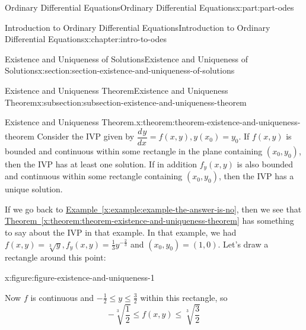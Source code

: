 \documentclass[twoside,10pt,]{book}
\newcommand{\xreffont}{\relax}
\numberwithin{equation}{part}
\providecommand{\dv}[3][]{\dfrac{d^{#1} #2}{d #3^{#1}}}
\begin{document}
\begin{partptx}{Ordinary Differential Equations}{}{Ordinary Differential Equations}{}{}{x:part:part-odes}
\begin{chapterptx}{Introduction to Ordinary Differential Equations}{}{Introduction to Ordinary Differential Equations}{}{}{x:chapter:intro-to-odes}
\begin{sectionptx}{Existence and Uniqueness of Solutions}{}{Existence and Uniqueness of Solutions}{}{}{x:section:section-existence-and-uniqueness-of-solutions}
\begin{subsectionptx}{Existence and Uniqueness Theorem}{}{Existence and Uniqueness Theorem}{}{}{x:subsection:subsection-existence-and-uniqueness-theorem}
\begin{theorem}{Existence and Uniqueness Theorem.}{}{x:theorem:theorem-existence-and-uniqueness-theorem}
%
Consider the IVP given by \(\dv{y}{x} = f(x,y), y(x_{0}) = y_{0}\). If \(f(x,y)\) is bounded and continuous within some rectangle in the plane containing \((x_{0},y_{0})\), then the IVP has at least one solution. If in addition \(f_{y}(x,y)\) is also bounded and continuous within some rectangle containing \((x_{0},y_{0})\), then the IVP has a unique solution.%
\end{theorem}
If we go back to \hyperref[x:example:example-the-answer-is-no]{Example~{\xreffont\ref{x:example:example-the-answer-is-no}}}, then we see that \hyperref[x:theorem:theorem-existence-and-uniqueness-theorem]{Theorem~{\xreffont\ref{x:theorem:theorem-existence-and-uniqueness-theorem}}} has something to say about the IVP in that example. In that example, we had \(f(x,y) = \sqrt[3]{y}, f_{y}(x,y) = \frac{1}{3}y^{-\frac{2}{3}}\) and \((x_{0},y_{0}) = (1,0)\). Let's draw a rectangle around this point: \begin{figureptx}{}{x:figure:figure-existence-and-uniqueness-1}{}%
\begin{image}{0.25}{0.5}{0.25}%
%
\end{image}%
\tcblower
\end{figureptx}%
%
\par
Now \(f\) is continuous and \(-\frac{1}{2}\leq y\leq\frac{3}{2}\) within this rectangle, so%
\begin{equation*}
-\sqrt[3]{\frac{1}{2}}\leq f(x,y)\leq\sqrt[3]{\frac{3}{2}}
\end{equation*}

\end{subsectionptx}
\end{sectionptx}
\end{chapterptx}
\end{partptx}
\end{document}
